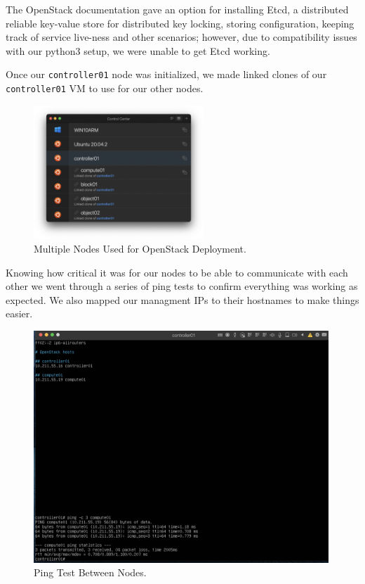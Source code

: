 \documentclass{article}
\begin{document}
The OpenStack documentation gave an option for installing Etcd, a distributed reliable key-value store for distributed key locking, storing configuration, keeping track of service live-ness and other scenarios; however, due to compatibility issues with our python3 setup, we were unable to get Etcd working.

Once our \texttt{controller01} node was initialized, we made linked clones of our \texttt{controller01} VM to use for our other nodes.

\begin{figure}[ht]
    \centering
    \includegraphics[width=0.57\textwidth]{Nodes.png}
    \caption{Multiple Nodes Used for OpenStack Deployment.}
    \label{fig:Nodes}
\end{figure}
\newpage

Knowing how critical it was for our nodes to be able to communicate with each other we went through a series of ping tests to confirm everything was working as expected. We also mapped our managment IPs to their hostnames to make things easier.

\begin{figure}[ht]
    \centering
    \includegraphics[width=0.99\textwidth]{PingTest.png}
    \caption{Ping Test Between Nodes.}
    \label{fig:PingTest}
\end{figure}
\end{document}
